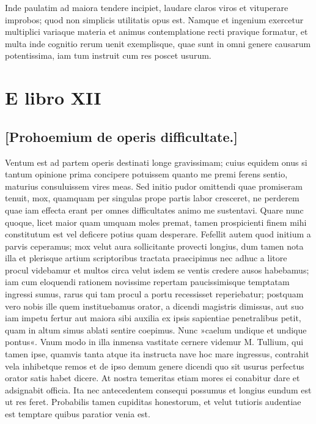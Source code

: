 Inde paulatim ad maiora tendere incipiet, laudare claros viros et vituperare improbos; quod non simplicis utilitatis opus est. Namque et ingenium exercetur multiplici variaque materia et animus contemplatione recti pravique formatur, et multa inde cognitio rerum uenit exemplisque, quae sunt in omni genere causarum potentissima, iam tum instruit cum res poscet usurum.

\section*{E libro XII}

\subsection*{[Prohoemium de operis difficultate.]}
 

Ventum est ad partem operis destinati longe gravissimam; cuius equidem onus si tantum opinione prima concipere potuissem quanto me premi ferens sentio, maturius consuluissem vires meas. Sed initio pudor omittendi quae promiseram tenuit, mox, quamquam per singulas prope partis labor cresceret, ne perderem quae iam effecta erant per omnes difficultates animo me sustentavi. Quare nunc quoque, licet maior quam umquam moles premat, tamen prospicienti finem mihi constitutum est vel deficere potius quam desperare. Fefellit autem quod initium a parvis ceperamus; mox velut aura sollicitante provecti longius, dum tamen nota illa et plerisque artium scriptoribus tractata praecipimus nec adhuc a litore procul videbamur et multos circa velut isdem se ventis credere ausos habebamus; iam cum eloquendi rationem novissime repertam paucissimisque temptatam ingressi sumus, rarus qui tam procul a portu recessisset reperiebatur; postquam vero nobis ille quem instituebamus orator, a dicendi magistris dimissus, aut suo iam impetu fertur aut maiora sibi auxilia ex ipsis sapientiae penetralibus petit, quam in altum simus ablati sentire coepimus. Nunc »caelum undique et undique pontus«. Vnum modo in illa inmensa vastitate cernere videmur M. Tullium, qui tamen ipse, quamvis tanta atque ita instructa nave hoc mare ingressus, contrahit vela inhibetque remos et de ipso demum genere dicendi quo sit usurus perfectus orator satis habet dicere. At nostra temeritas etiam mores ei conabitur dare et adsignabit officia. Ita nec antecedentem consequi possumus et longius eundum est ut res feret. Probabilis tamen cupiditas honestorum, et velut tutioris audentiae est temptare quibus paratior venia est.
 

